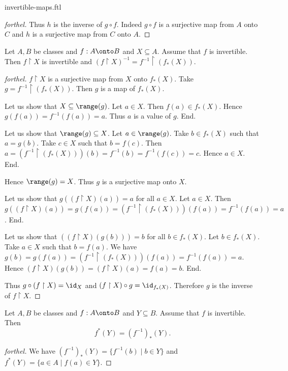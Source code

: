 \documentclass{naproche-library}
\begin{document}
\begin{smodule}{invertible-maps.ftl}
\begin{proof}[forthel]
    Thus $h$ is the inverse of $g \circ f$.
    Indeed $g \circ f$ is a surjective map from $A$ onto $C$ and $h$ is a surjective map from $C$ onto $A$.
  \end{proof}

  \begin{proposition}[forthel,id=FOUNDATIONS_09_6374884963778560,printid]
    Let $A, B$ be classes and $f : A \onto B$ and $X \subseteq A$.
    Assume that $f$ is invertible.
    Then $f \restriction X$ is invertible and $(f\restriction X)^{-1} = f^{-1} \restriction (f_{*}(X))$.
  \end{proposition}
  \begin{proof}[forthel]
    $f \restriction X$ is a surjective map from $X$ onto $f_{*}(X)$.
    Take $g = f^{-1} \restriction (f_{*}(X))$.
    Then $g$ is a map of $f_{*}(X)$.

    Let us show that $X \subseteq \range(g)$.
      Let $a \in X$.
      Then $f(a) \in f_{*}(X)$.
      Hence $g(f(a)) = f^{-1}(f(a)) = a$.
      Thus $a$ is a value of $g$.
    End.

    Let us show that $\range(g) \subseteq X$.
      Let $a \in \range(g)$.
      Take $b \in f_{*}(X)$ such that $a = g(b)$.
      Take $c \in X$ such that $b = f(c)$.
      Then $a
        = (f^{-1} \restriction (f_{*}(X)))(b)
        = f^{-1}(b)
        = f^{-1}(f(c))
        = c$.
      Hence $a \in X$.
    End.

    Hence $\range(g) = X$.
    Thus $g$ is a surjective map onto $X$.

    Let us show that $g((f \restriction X)(a)) = a$ for all $a \in X$.
      Let $a \in X$.
      Then $g((f \restriction X)(a))
        = g(f(a))
        = (f^{-1} \restriction (f_{*}(X)))(f(a))
        = f^{-1}(f(a))
        = a$.
    End.

    Let us show that $((f \restriction X)(g(b))) = b$ for all $b \in f_{*}(X)$.
      Let $b \in f_{*}(X)$.
      Take $a \in X$ such that $b = f(a)$.
      We have $g(b)
        = g(f(a))
        = (f^{-1} \restriction (f_{*}(X)))(f(a))
        = f^{-1}(f(a))
        = a$.
      Hence $(f \restriction X)(g(b))
        = (f \restriction X)(a)
        = f(a)
        = b$.
    End.

    Thus $g \circ (f \restriction X) = \id_{X}$ and $(f \restriction X) \circ g = \id_{f_{*}(X)}$.
    Therefore $g$ is the inverse of $f \restriction X$.
  \end{proof}

  \begin{proposition}[forthel,id=FOUNDATIONS_09_7726021377785856,printid]
    Let $A, B$ be classes and $f : A \onto B$ and $Y \subseteq B$.
    Assume that $f$ is invertible.
    Then \[ f^{*}(Y) = (f^{-1})_{*}(Y). \]
  \end{proposition}
  \begin{proof}[forthel]
    We have $(f^{-1})_{*}(Y) = \{ f^{-1}(b) \mid b \in Y \}$ and $f^{*}(Y) = \{ a \in A \mid f(a) \in Y \}$.


\end{proof}
\end{smodule}
\end{document}
